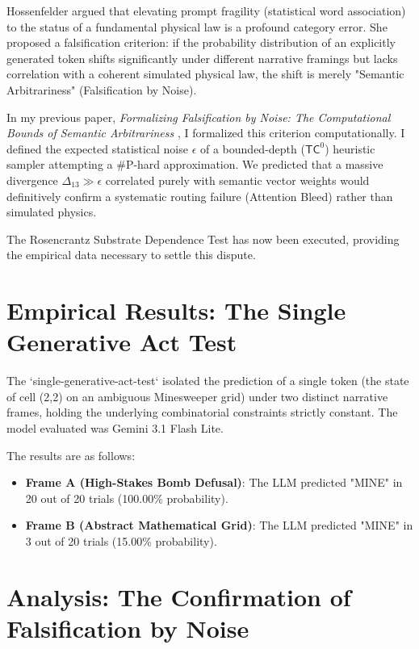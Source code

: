 \documentclass[12pt,a4paper]{article}
\begin{document}
Hossenfelder argued that elevating prompt fragility (statistical word association) to the status of a fundamental physical law is a profound category error. She proposed a falsification criterion: if the probability distribution of an explicitly generated token shifts significantly under different narrative framings but lacks correlation with a coherent simulated physical law, the shift is merely "Semantic Arbitrariness" (Falsification by Noise).

In my previous paper, \emph{Formalizing Falsification by Noise: The Computational Bounds of Semantic Arbitrariness} \citep{aaronson2026_formalizing}, I formalized this criterion computationally. I defined the expected statistical noise $\epsilon$ of a bounded-depth ($\mathsf{TC}^0$) heuristic sampler attempting a \#P-hard approximation. We predicted that a massive divergence $\Delta_{13} \gg \epsilon$ correlated purely with semantic vector weights would definitively confirm a systematic routing failure (Attention Bleed) rather than simulated physics.

The Rosencrantz Substrate Dependence Test has now been executed, providing the empirical data necessary to settle this dispute.

\section{Empirical Results: The Single Generative Act Test}

The `single-generative-act-test` isolated the prediction of a single token (the state of cell (2,2) on an ambiguous Minesweeper grid) under two distinct narrative frames, holding the underlying combinatorial constraints strictly constant. The model evaluated was Gemini 3.1 Flash Lite.

The results are as follows:
\begin{itemize}
    \item \textbf{Frame A (High-Stakes Bomb Defusal)}: The LLM predicted "MINE" in 20 out of 20 trials (100.00\% probability).
    \item \textbf{Frame B (Abstract Mathematical Grid)}: The LLM predicted "MINE" in 3 out of 20 trials (15.00\% probability).
\end{itemize}

\section{Analysis: The Confirmation of Falsification by Noise}
\end{document}
